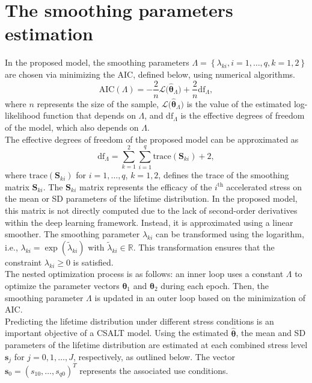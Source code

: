 \documentclass[twoside]{article}
\begin{document}
\section{The smoothing parameters estimation}\label{sec3}
In the proposed model, the smoothing parameters $\Lambda=\left\{\lambda_{ki}, i=1,\ldots,q, k=1,2\right\}$ are chosen via minimizing the AIC, defined below, using numerical algorithms.
\begin{equation}\label{eq3.1}
\text{AIC}\left(\Lambda\right) = -\frac{2}{n}\mathcal{L}\big(\hat{\boldsymbol{\theta}}_{\Lambda} \big) + \frac{2}{n} \text{df}_{\Lambda},             
\end{equation}
where $n$ represents the size of the sample, $\mathcal{L}\big(\hat{\boldsymbol{\theta}}_{\Lambda} \big)$ is the value of the estimated log-likelihood function that depends on $\Lambda$, and $\text{df}_{\Lambda}$ is the effective degrees of freedom of the model, which also depends on $\Lambda$.\\
The effective degrees of freedom of the proposed model can be approximated as
\begin{equation*}
\text{df}_{\Lambda} = \sum_{k=1}^{2}\sum_{i=1}^{q}\text{trace}(\textbf{S}_{ki}) + 2,           
\end{equation*}
where $\text{trace}(\boldsymbol{S}_{ki})$ for $i=1,\ldots,q$, $k=1,2$, defines the trace of the smoothing matrix $\boldsymbol{S}_{ki}$. The $\boldsymbol{S}_{ki}$ matrix represents the efficacy of the $i^{\text{th}}$ accelerated stress on the mean or SD parameters of the lifetime distribution. In the proposed model, this matrix is not directly computed due to the lack of second-order derivatives within the deep learning framework. Instead, it is approximated using a linear smoother. The smoothing parameter $\lambda_{ki}$ can be transformed using the logarithm, i.e., $\lambda_{ki}=\exp(\tilde{\lambda}_{ki})$ with $\tilde{\lambda}_{ki} \in \mathbb{R}$. This transformation ensures that the constraint \(\lambda_{ki} \geq 0\) is satisfied.\\
The nested optimization process is as follows: an inner loop uses a constant $\Lambda$ to optimize the parameter vectors $\boldsymbol{\theta}_{1}$ and $\boldsymbol{\theta}_{2}$ during each epoch. Then, the smoothing parameter $\Lambda$ is updated in an outer loop based on the minimization of AIC. \\
Predicting the lifetime distribution under different stress conditions is an important objective of a CSALT model. Using the estimated $\hat{\boldsymbol{\theta}}$, the mean and SD parameters of the lifetime distribution are estimated at each combined stress level $\boldsymbol{s}_{j}$ for $j = 0, 1, \ldots, J$, respectively, as outlined below. The vector $\boldsymbol{s}_{0} = (s_{10}, \ldots , s_{q0})^{T}$ represents the associated use conditions.
\end{document}
